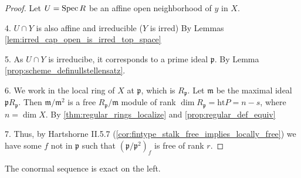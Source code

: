 \begin{proof}

  Let $U = \operatorname{Spec} R$ be an affine open neighborhood of $y$ in $X$.
  
  4. $U \cap Y$ is also affine and irreducible ($Y$ is irred)
     By Lemmas \ref{lem:irred_cap_open_is_irred_top_space}

  5. As $U \cap Y$ is irreducibe, it corresponds to a prime ideal
     $\mathfrak{p}$.
     By Lemma \ref{prop:scheme_definullstellensatz}.

     6. We work in the local ring of $X$ at $\mathfrak{p}$, which is $R_{\mathfrak{p}}$.
     Let $\mathfrak{m}$ be the maximal ideal $\mathfrak{p} R_{\mathfrak{p}}$.
     Then $\mathfrak{m} / \mathfrak{m}^2$ is a free 
     $R_{\mathfrak{p}} / \mathfrak{m}$ module of rank
     $\dim R_{\mathfrak{p}} = \text{ht} P = n-s$, where $n = \dim X$.
     By \ref{thm:regular_rings_localize} and \ref{prop:regular_def_equiv}


  7. Thus, by Hartshorne II.5.7 
     (\ref{cor:fintype_stalk_free_implies_locally_free}) 
     we have some $f$ not in $\mathfrak{p}$
     such that $(\mathfrak{p} / \mathfrak{p}^2)_f$ is free of rank $r$.
\end{proof}

\begin{theorem}
  \label{thm:regular_implies_conormal_exact}
  The conormal sequence is exact on 
  the left.
\end{theorem}

